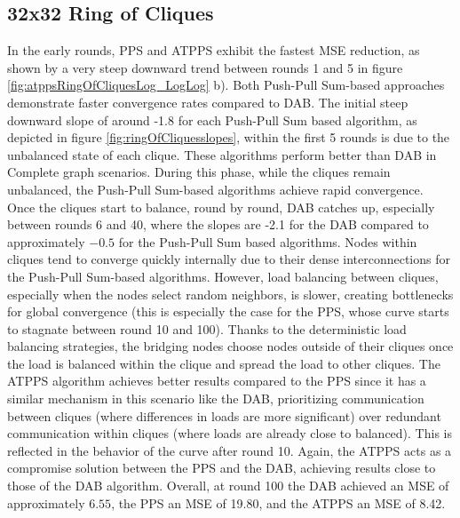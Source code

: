 \subsection{32x32 Ring of Cliques}\label{subsec:32_32ROC}
In the early rounds, PPS and ATPPS exhibit the fastest MSE reduction, as shown by a very steep downward trend between rounds 1 and 5 in figure \ref{fig:atppsRingOfCliquesLog_LogLog} b). Both Push-Pull Sum-based approaches demonstrate faster convergence rates compared to DAB. The initial steep downward slope of around -1.8 for each Push-Pull Sum based algorithm, as depicted in figure \ref{fig:ringOfCliquesslopes}, within the first 5 rounds is due to the unbalanced state of each clique. These algorithms perform better than DAB in Complete graph scenarios. During this phase, while the cliques remain unbalanced, the Push-Pull Sum-based algorithms achieve rapid convergence. Once the cliques start to balance, round by round, DAB catches up, especially between rounds 6 and 40, where the slopes are -2.1 for the DAB compared to approximately $-0.5$ for the Push-Pull Sum based algorithms. Nodes within cliques tend to converge quickly internally due to their dense interconnections for the Push-Pull Sum-based algorithms. However, load balancing between cliques, especially when the nodes select random neighbors, is slower, creating bottlenecks for global convergence (this is especially the case for the PPS, whose curve starts to stagnate between round 10 and 100). Thanks to the deterministic load balancing strategies, the bridging nodes choose nodes outside of their cliques once the load is balanced within the clique and spread the load to other cliques. The ATPPS algorithm achieves better results compared to the PPS since it has a similar mechanism in this scenario like the DAB, prioritizing communication between cliques (where differences in loads are more significant) over redundant communication within cliques (where loads are already close to balanced). This is reflected in the behavior of the curve after round 10. Again, the ATPPS acts as a compromise solution between the PPS and the DAB, achieving results close to those of the DAB algorithm. Overall, at round 100 the DAB achieved an MSE of approximately $6.55$, the PPS an MSE of 19.80, and the ATPPS an MSE of 8.42.

